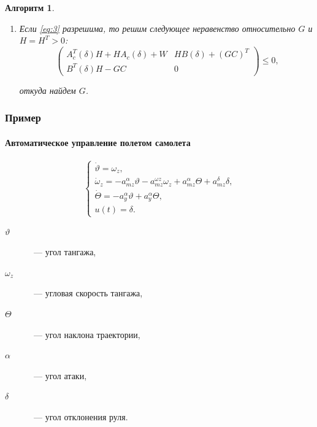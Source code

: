 \documentclass[ignorenonframetext,hyperref={pdftex,unicode},compress,handout]{beamer}
\newcommand{\br}{\vspace{12pt}}
\newtheorem{alg}{Алгоритм}
\begin{document}
\begin{frame}
\begin{alg}
\begin{enumerate}
            \item
            \par Если \ref{eq:3} разрешима, то решим следующее неравенство относительно $G$ и $H = H^T > 0$:
            \begin{equation}
                \left(
                    \begin{array}{cc}
                        A^T_c(\delta)H + HA_c(\delta) + W   &   HB(\delta) + (GC)^T \\
                        B^T(\delta)H - GC   &   0
                    \end{array}
                \right) \leqslant 0\mbox{,}
            \end{equation}
            \par откуда найдем $G$.
        \end{enumerate}
    \end{alg}
\end{frame}





\begin{frame}
    \frametitle{Пример}
    \framesubtitle{Автоматическое управление полетом самолета}
        \begin{equation}
            \left\{
                \begin{array}{l}
                    \dot{\vartheta} = \omega_z\mbox{,} \\
                    \dot{\omega}_z = -a_{mz}^\alpha\vartheta - a_{mz}^{\omega z}\omega_z + a_{mz}^\alpha\Theta + a_{mz}^\delta\delta\mbox{,} \\
                    \dot{\Theta} = -a_y^\alpha\vartheta + a_y^\alpha\Theta\mbox{,} \\
                    u(t) = \delta\mbox{.}
                \end{array}
            \right.
        \end{equation}
        \br
        \begin{description}
            \item[$\vartheta$]~--- угол тангажа,
            \item[$\omega_z$]~--- угловая скорость тангажа,
            \item[$\Theta$]~--- угол наклона траектории,
            \item[$\alpha$]~--- угол атаки,
            \item[$\delta$]~--- угол отклонения руля.
        \end{description}
\end{frame}
\end{document}
